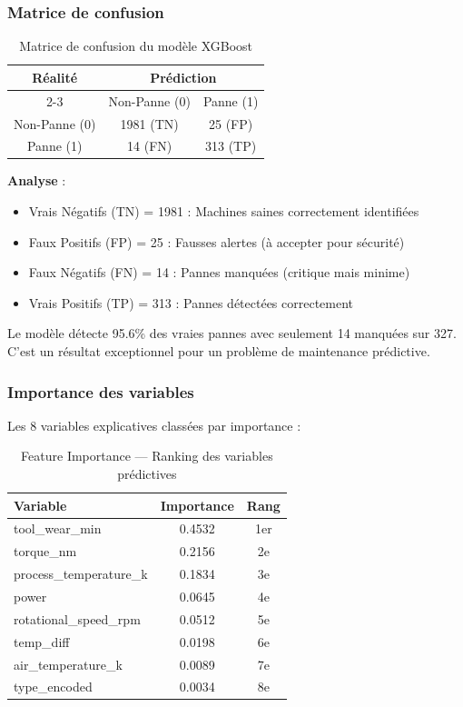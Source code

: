 \documentclass[a4paper,12pt,twoside]{report}
\begin{document}
\subsubsection{Matrice de confusion}

\begin{table}[H]
\centering
\small
\caption{Matrice de confusion du modèle XGBoost}
\begin{tabular}{|c|c|c|}
\hline
\multirow{2}{*}{\textbf{Réalité}} & \multicolumn{2}{c|}{\textbf{Prédiction}} \\
\cline{2-3}
& Non-Panne (0) & Panne (1) \\
\hline
Non-Panne (0) & 1981 (TN) & 25 (FP) \\
\hline
Panne (1) & 14 (FN) & 313 (TP) \\
\hline
\end{tabular}

\textbf{Analyse} :
\begin{itemize}
    \item Vrais Négatifs (TN) = 1981 : Machines saines correctement identifiées
    \item Faux Positifs (FP) = 25 : Fausses alertes (à accepter pour sécurité)
    \item Faux Négatifs (FN) = 14 : Pannes manquées (critique mais minime)
    \item Vrais Positifs (TP) = 313 : Pannes détectées correctement
\end{itemize}

Le modèle détecte 95.6\% des vraies pannes avec seulement 14 manquées sur 327. C'est un résultat exceptionnel pour un problème de maintenance prédictive.
\end{table}

\subsubsection{Importance des variables}

Les 8 variables explicatives classées par importance :

\begin{table}[H]
\centering
\small
\caption{Feature Importance — Ranking des variables prédictives}
\begin{tabular}{|l|c|c|}
\hline
\textbf{Variable} & \textbf{Importance} & \textbf{Rang} \\
\hline\hline
tool\_wear\_min & 0.4532 & 1er \\
\hline
torque\_nm & 0.2156 & 2e \\
\hline
process\_temperature\_k & 0.1834 & 3e \\
\hline
power & 0.0645 & 4e \\
\hline
rotational\_speed\_rpm & 0.0512 & 5e \\
\hline
temp\_diff & 0.0198 & 6e \\
\hline
air\_temperature\_k & 0.0089 & 7e \\
\hline
type\_encoded & 0.0034 & 8e \\
\hline
\end{tabular}
\end{table}
\end{document}
